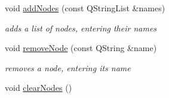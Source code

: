 \begin{DoxyCompactItemize}
void \hyperlink{class_g_v_sub_graph_af805b3fbfb96c0b1cb99ecc311f1a7f8}{add\-Nodes} (const \-Q\-String\-List \&names)
\begin{DoxyCompactList}\small\item\em adds a list of nodes, entering their names \end{DoxyCompactList}\item 
void \hyperlink{class_g_v_sub_graph_ac97b366dadeeb5ac8999ee6b22dd7dd4}{remove\-Node} (const \-Q\-String \&name)
\begin{DoxyCompactList}\small\item\em removes a node, entering its name \end{DoxyCompactList}\item 
\hypertarget{class_g_v_sub_graph_a57609be587187f492288d224216b3b14}{void \hyperlink{class_g_v_sub_graph_a57609be587187f492288d224216b3b14}{clear\-Nodes} ()}\label{class_g_v_sub_graph_a57609be587187f492288d224216b3b14}


\end{DoxyCompactItemize}

